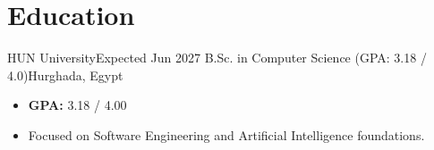 \section{Education}
\resumeSubHeadingListStart

\resumeSubheading
{HUN University}{Expected Jun 2027}
{B.Sc. in Computer Science (GPA: 3.18 / 4.0)}{Hurghada, Egypt}
\begin{itemize}
    \item \textbf{GPA:} 3.18 / 4.00
    \item Focused on Software Engineering and Artificial Intelligence foundations.
\end{itemize}

\resumeSubHeadingListEnd
